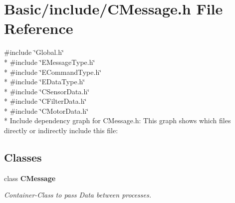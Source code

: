 \section{Basic/include/\-C\-Message.h File Reference}
\label{CMessage_8h}
{\ttfamily \#include \char`\"{}Global.\-h\char`\"{}}\\*
{\ttfamily \#include \char`\"{}E\-Message\-Type.\-h\char`\"{}}\\*
{\ttfamily \#include \char`\"{}E\-Command\-Type.\-h\char`\"{}}\\*
{\ttfamily \#include \char`\"{}E\-Data\-Type.\-h\char`\"{}}\\*
{\ttfamily \#include \char`\"{}C\-Sensor\-Data.\-h\char`\"{}}\\*
{\ttfamily \#include \char`\"{}C\-Filter\-Data.\-h\char`\"{}}\\*
{\ttfamily \#include \char`\"{}C\-Motor\-Data.\-h\char`\"{}}\\*
Include dependency graph for C\-Message.\-h\-:
This graph shows which files directly or indirectly include this file\-:
\subsection*{Classes}
\begin{DoxyCompactItemize}
\item 
class {\bf C\-Message}
\begin{DoxyCompactList}\small\item\em Container-\/\-Class to pass Data between processes. \end{DoxyCompactList}\end{DoxyCompactItemize}

